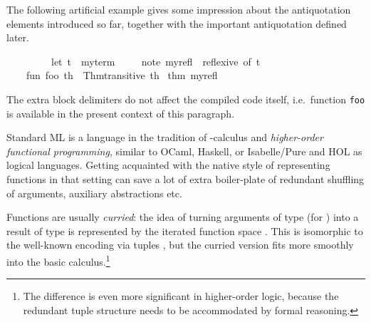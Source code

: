 \begin{isabellebody}
\begin{isamarkuptext}
\begin{description}
  \end{description}%
\end{isamarkuptext}%
\isamarkuptrue%
%
\endisatagmlantiq
{\isafoldmlantiq}%
%
\isadelimmlantiq
%
\endisadelimmlantiq
%
\isadelimmlex
%
\endisadelimmlex
%
\isatagmlex
%
\begin{isamarkuptext}%
The following artificial example gives some impression
  about the antiquotation elements introduced so far, together with
  the important  antiquotation defined later.%
\end{isamarkuptext}%
\isamarkuptrue%
%
\endisatagmlex
{\isafoldmlex}%
%
\isadelimmlex
%
\endisadelimmlex
%
\isadelimML
%
\endisadelimML
%
\isatagML
{}\isamarkupfalse%
\ {\isacharverbatimopen}\isanewline
\ \ {\isaantiqopen}\isanewline
\ \ \ \ %
\isaantiq
let\ {\isacharquery}t\ {\isacharequal}\ my{\isacharunderscore}term%
\endisaantiq
\isanewline
\ \ \ \ %
\isaantiq
note\ my{\isacharunderscore}refl\ {\isacharequal}\ reflexive\ {\isacharbrackleft}of\ {\isacharquery}t{\isacharbrackright}%
\endisaantiq
\isanewline
\ \ \ \ fun\ foo\ th\ {\isacharequal}\ Thm{\isachardot}transitive\ th\ %
\isaantiq
thm\ my{\isacharunderscore}refl%
\endisaantiq
\isanewline
\ \ {\isaantiqclose}\isanewline
{\isacharverbatimclose}%
\endisatagML
{\isafoldML}%
%
\isadelimML
%
\endisadelimML
%
\begin{isamarkuptext}%
The extra block delimiters do not affect the compiled code
  itself, i.e.\ function \verb|foo| is available in the present context
  of this paragraph.%
\end{isamarkuptext}%
\isamarkuptrue%
%
\isamarkuptrue%
%
\begin{isamarkuptext}%
Standard ML is a language in the tradition of \isa{{\isasymlambda}}-calculus and \emph{higher-order functional programming},
  similar to OCaml, Haskell, or Isabelle/Pure and HOL as logical
  languages.  Getting acquainted with the native style of representing
  functions in that setting can save a lot of extra boiler-plate of
  redundant shuffling of arguments, auxiliary abstractions etc.

  Functions are usually \emph{curried}: the idea of turning arguments
  of type  (for ) into a result of
  type \isa{{\isasymtau}} is represented by the iterated function space
  .  This is isomorphic to the well-known
  encoding via tuples , but the curried
  version fits more smoothly into the basic calculus.\footnote{The
  difference is even more significant in higher-order logic, because
  the redundant tuple structure needs to be accommodated by formal
  reasoning.}


\end{isamarkuptext}
\end{isabellebody}
